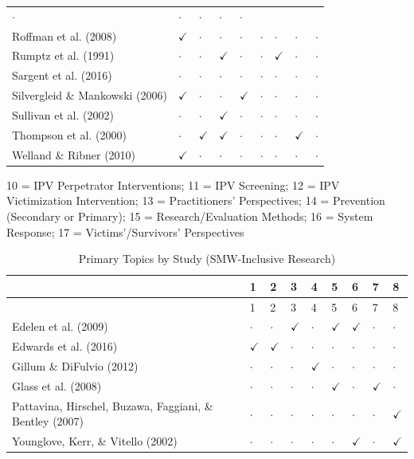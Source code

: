 \documentclass[11pt,]{tufte-book}
\begin{document}
\begin{no-prefix-table-caption}
\begin{longtable}[]{@{}lllllllll@{}}
\(\cdot\) & \(\cdot\) & \(\cdot\) & \(\cdot\) & \(\cdot\)\tabularnewline
Roffman et al. (2008) & \(\checkmark\) & \(\cdot\) & \(\cdot\) &
\(\cdot\) & \(\cdot\) & \(\cdot\) & \(\cdot\) & \(\cdot\)\tabularnewline
Rumptz et al. (1991) & \(\cdot\) & \(\cdot\) & \(\checkmark\) &
\(\cdot\) & \(\cdot\) & \(\checkmark\) & \(\cdot\) &
\(\cdot\)\tabularnewline
Sargent et al. (2016) & \(\cdot\) & \(\cdot\) & \(\cdot\) & \(\cdot\) &
\(\cdot\) & \(\cdot\) & \(\cdot\) & \(\cdot\)\tabularnewline
Silvergleid \& Mankowski (2006) & \(\checkmark\) & \(\cdot\) & \(\cdot\)
& \(\checkmark\) & \(\cdot\) & \(\cdot\) & \(\cdot\) &
\(\cdot\)\tabularnewline
Sullivan et al. (2002) & \(\cdot\) & \(\cdot\) & \(\checkmark\) &
\(\cdot\) & \(\cdot\) & \(\cdot\) & \(\cdot\) & \(\cdot\)\tabularnewline
Thompson et al. (2000) & \(\cdot\) & \(\checkmark\) & \(\checkmark\) &
\(\cdot\) & \(\cdot\) & \(\cdot\) & \(\checkmark\) &
\(\cdot\)\tabularnewline
Welland \& Ribner (2010) & \(\checkmark\) & \(\cdot\) & \(\cdot\) &
\(\cdot\) & \(\cdot\) & \(\cdot\) & \(\cdot\) & \(\cdot\)\tabularnewline
\bottomrule
\end{longtable}

\end{no-prefix-table-caption}

10 = IPV Perpetrator Interventions; 11 = IPV Screening; 12 = IPV
Victimization Intervention; 13 = Practitioners' Perspectives; 14 =
Prevention (Secondary or Primary); 15 = Research/Evaluation Methods; 16
= System Response; 17 = Victims'/Survivors' Perspectives

\newpage

\begin{longtable}[]{@{}lllllllll@{}}
\caption{Primary Topics by Study (SMW-Inclusive Research)
\label{tbl:ks4tp}}\tabularnewline
\toprule
& 1 & 2 & 3 & 4 & 5 & 6 & 7 & 8\tabularnewline
\midrule
\endfirsthead
\toprule
& 1 & 2 & 3 & 4 & 5 & 6 & 7 & 8\tabularnewline
\midrule
\endhead
Edelen et al. (2009) & \(\cdot\) & \(\cdot\) & \(\checkmark\) &
\(\cdot\) & \(\checkmark\) & \(\checkmark\) & \(\cdot\) &
\(\cdot\)\tabularnewline
Edwards et al. (2016) & \(\checkmark\) & \(\checkmark\) & \(\cdot\) &
\(\cdot\) & \(\cdot\) & \(\cdot\) & \(\cdot\) & \(\cdot\)\tabularnewline
Gillum \& DiFulvio (2012) & \(\cdot\) & \(\cdot\) & \(\cdot\) &
\(\checkmark\) & \(\cdot\) & \(\cdot\) & \(\cdot\) &
\(\cdot\)\tabularnewline
Glass et al. (2008) & \(\cdot\) & \(\cdot\) & \(\cdot\) & \(\cdot\) &
\(\checkmark\) & \(\cdot\) & \(\checkmark\) & \(\cdot\)\tabularnewline
Pattavina, Hirschel, Buzawa, Faggiani, \& Bentley (2007) & \(\cdot\) &
\(\cdot\) & \(\cdot\) & \(\cdot\) & \(\cdot\) & \(\cdot\) & \(\cdot\) &
\(\checkmark\)\tabularnewline
Younglove, Kerr, \& Vitello (2002) & \(\cdot\) & \(\cdot\) & \(\cdot\) &
\(\cdot\) & \(\cdot\) & \(\checkmark\) & \(\cdot\) &
\(\checkmark\)\tabularnewline
\bottomrule
\end{longtable}
\end{document}
